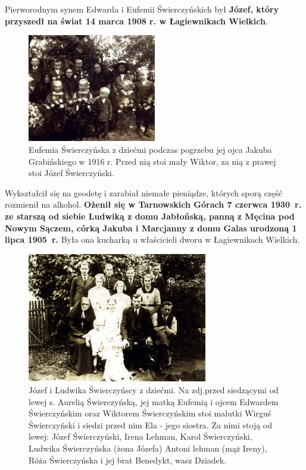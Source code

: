 Pierworodnym synem Edwarda i Eufemii Świerczyńskich był \textbf{Józef, który przyszedł na świat 14 marca 1908 r. w Łagiewnikach Wielkich}.

\begin{figure}[!h]
\begin{center}
\includegraphics[width=0.5\textwidth]{photo/eufemia_swierczynska_z_dziecmi.jpg}
\caption[Eufemia Świerczyńska z dziećmi podczas pogrzebu jej ojca Jakuba Grabińskiego w 1916 r.]{Eufemia Świerczyńska z dziećmi podczas pogrzebu jej ojca Jakuba Grabińskiego w 1916 r. Przed nią stoi mały Wiktor, za nią z prawej stoi Józef Świerczyński.}
\label{rys:eufemia_swierczynska_z_dziecmi}
\end{center}
\end{figure}

Wykształcił się na geodetę i zarabiał niemałe pieniądze, których sporą część rozmienił na alkohol. \textbf{Ożenił się w Tarnowskich Górach 7 czerwca 1930~r.  ze starszą od siebie Ludwiką z domu Jabłońską, panną z Męcina pod Nowym Sączem, córką Jakuba i Marcjanny z domu Galas urodzoną 1 lipca 1905~r.} Była ona kucharką u właścicieli dworu w Łagiewnikach Wielkich.

\begin{figure}[!h]
\begin{center}
\includegraphics[width=0.7\textwidth]{photo/jozef_ludwika_swierczynscy_z_dziecmi.jpg}
\caption[Józef i Ludwika Świerczyńscy z dziećmi]{Józef i Ludwika Świerczyńscy z dziećmi. Na zdj.przed siedzącymi od lewej s. Aurelią Świerczyńską, jej matką Eufemią i ojcem Edwardem Świerczyńskim oraz Wiktorem Świerczyńskim stoi malutki Wirguś Świerczyński i siedzi przed nim Ela - jego siostra. Za nimi stoją od lewej: Józef Świerczyński, Irena Lehman, Karol Świerczyński, Ludwika Świerczyńska (żona Józefa) Antoni lehman (mąż Ireny), Róża Świerczyńska i jej brat Benedykt, wasz Dziadek.}
\label{rys:jozef_ludwika_swierczynscy_z_dziecmi}
\end{center}
\end{figure}

